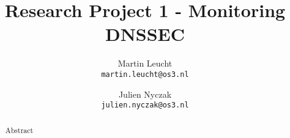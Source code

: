 \documentclass{report}
\title{Research Project 1 - Monitoring DNSSEC}
\author{
	Martin Leucht \\ 
	\texttt{martin.leucht@os3.nl}
	\and Julien Nyczak \\
	\texttt{julien.nyczak@os3.nl}
}
\begin{document}
\maketitle


\begin{abstract}
Abstract
\end{abstract}

\tableofcontents

\newpage


















\end{document}
